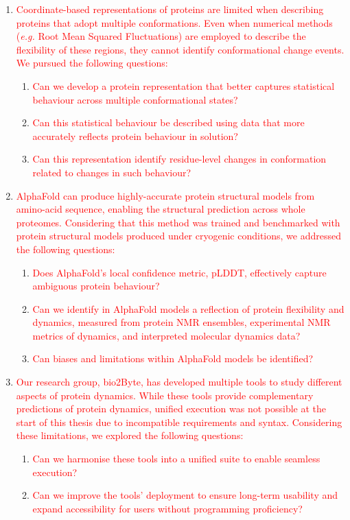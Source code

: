 \begin{enumerate}
    \item \textcolor{red}{Coordinate-based representations of proteins are limited when describing proteins that adopt multiple conformations. Even when numerical methods (\textit{e.g.} Root Mean Squared Fluctuations) are employed to describe the flexibility of these regions, they cannot identify conformational change events. We pursued the following questions:} 
    \begin{enumerate}
        \item \textcolor{red}{Can we develop a protein representation that better captures statistical behaviour across multiple conformational states?}
        \item \textcolor{red}{Can this statistical behaviour be described using data that more accurately reflects protein behaviour in solution?}
        \item \textcolor{red}{Can this representation identify residue-level changes in conformation related to changes in such behaviour?}
    \end{enumerate}
    
    \item \textcolor{red}{AlphaFold can produce highly-accurate protein structural models from amino-acid sequence, enabling the structural prediction across whole proteomes. Considering that this method was trained and benchmarked with protein structural models produced under cryogenic conditions, we addressed the following questions: }
    \begin{enumerate}
        \item \textcolor{red}{Does AlphaFold's local confidence metric, pLDDT, effectively capture ambiguous protein behaviour?}
        \item \textcolor{red}{Can we identify in AlphaFold models a reflection of protein flexibility and dynamics, measured from protein NMR ensembles, experimental NMR metrics of dynamics, and interpreted molecular dynamics data?}
        \item \textcolor{red}{Can biases and limitations within AlphaFold models be identified?}
    \end{enumerate}

    \item \textcolor{red}{Our research group, bio2Byte, has developed multiple tools to study different aspects of protein dynamics. While these tools provide complementary predictions of protein dynamics, unified execution was not possible at the start of this thesis due to incompatible requirements and syntax. Considering these limitations, we explored the following questions: }
    \begin{enumerate}
        \item \textcolor{red}{Can we harmonise these tools into a unified suite to enable seamless execution?}
        \item \textcolor{red}{Can we improve the tools' deployment to ensure long-term usability and expand accessibility for users without programming proficiency?}
    \end{enumerate}
\end{enumerate}



